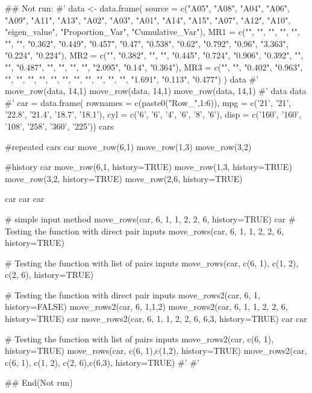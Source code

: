 \documentclass[a4paper]{book}
\begin{document}
\begin{Examples}
\begin{ExampleCode}

\#\# Not run: 
#'
data <- data.frame(
  source = c("A05", "A08", "A04",
  "A06", "A09", "A11", "A13", "A02",
  "A03", "A01", "A14", "A15", "A07",
  "A12", "A10", "eigen_value", "Proportion_Var", "Cumulative_Var"),
  MR1 = c("", "", "", "", "", "", "",
  "0.362", "0.449", "0.457", "0.47",
  "0.538", "0.62", "0.792", "0.96",
  "3.363", "0.224", "0.224"),
  MR2 = c("", "0.382", "", "", "0.445",
  "0.724", "0.906", "0.392", "", "",
  "0.487", "", "", "", "", "2.095", "0.14", "0.364"),
  MR3 = c("", "", "0.402", "0.963", "",
   "", "", "", "", "", "", "", "",
    "", "", "1.691", "0.113", "0.477")
)
data
#'
move_row(data, 14,1)
move_row(data, 14,1)%
move_row(data, 14,1)%
#'
data %
data %
#'
car = data.frame(
  rownames = c(paste0("Row_",1:6)),
  mpg = c('21', '21', '22.8', '21.4', '18.7', '18.1'),
  cyl = c('6', '6', '4', '6', '8', '6'),
  disp = c('160', '160', '108', '258', '360', '225'))
cars

#repeated
cars
car %
  move_row(6,1)%
  move_row(1,3)%
  move_row(3,2)

#history
car %
  move_row(6,1, history=TRUE)%
  move_row(1,3, history=TRUE)%
  move_row(3,2, history=TRUE)%
  move_row(2,6, history=TRUE)

car%
car%
car%

# simple input method
move_rows(car, 6, 1, 1, 2, 2, 6, history=TRUE)
car%
# Testing the function with direct pair inputs
move_rows(car, 6, 1, 1, 2, 2, 6, history=TRUE)

# Testing the function with list of pairs inputs
move_rows(car, c(6, 1), c(1, 2), c(2, 6), history=TRUE)


# Testing the function with direct pair inputs
move_rows2(car, 6, 1,  history=FALSE)
move_rows2(car, 6, 1,1,2)
move_rows2(car, 6, 1, 1, 2, 2, 6, history=TRUE)
car%
move_rows2(car, 6, 1, 1, 2, 2, 6, 6,3, history=TRUE)
car%
car%


# Testing the function with list of pairs inputs
move_rows2(car, c(6, 1), history=TRUE)
move_rows(car, c(6, 1),c(1,2), history=TRUE)
move_rows2(car, c(6, 1), c(1, 2), c(2, 6),c(6,3), history=TRUE)
#'
#'




## End(Not run)

\end{ExampleCode}
\end{Examples}
\end{document}
